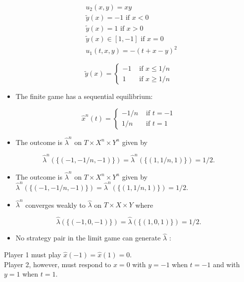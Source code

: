 \documentclass[10pt]{article}
\begin{document}
$$
\begin{aligned}
& u_{2}(x, y)=x y \\
& \tilde{y}(x)=-1 \text { if } x<0 \\
& \tilde{y}(x)=1 \text { if } x>0 \\
& \tilde{y}(x) \in[1,-1] \text { if } x=0 \\
& u_{1}(t, x, y)=-(t+x-y)^{2}
\end{aligned}
$$

$$
\tilde{y}(x)=\left\{\begin{aligned}
-1 & \text { if } x \leq 1 / n \\
1 & \text { if } x \geq 1 / n
\end{aligned}\right.
$$

\begin{itemize}
  \item The finite game has a sequential equilibrium:
\end{itemize}

$$
\hat{x}^{n}(t)=\left\{\begin{aligned}
-1 / n & \text { if } t=-1 \\
1 / n & \text { if } t=1
\end{aligned}\right.
$$

\begin{itemize}
  \item The outcome is $\hat{\lambda}^{n}$ on $T \times X^{n} \times Y^{n}$ given by
\end{itemize}

$$
\hat{\lambda}^{n}(\{(-1,-1 / n,-1)\})=\hat{\lambda}^{n}(\{(1,1 / n, 1)\})=1 / 2 .
$$

\begin{itemize}
  \item The outcome is $\hat{\lambda}^{n}$ on $T \times X^{n} \times Y^{n}$ given by $\hat{\lambda}^{n}(\{(-1,-1 / n,-1)\})=\hat{\lambda}^{n}(\{(1,1 / n, 1)\})=1 / 2$.
  \item $\hat{\lambda}^{n}$ converges weakly to $\hat{\lambda}$ on $T \times X \times Y$ where
\end{itemize}

$$
\hat{\lambda}(\{(-1,0,-1)\})=\hat{\lambda}(\{(1,0,1)\})=1 / 2 .
$$

\begin{itemize}
  \item No strategy pair in the limit game can generate $\hat{\lambda}$ :
\end{itemize}

Player 1 must play $\hat{x}(-1)=\hat{x}(1)=0$.\\
Player 2, however, must respond to $x=0$ with $y=-1$ when $t=-1$ and with $y=1$ when $t=1$.
\end{document}
